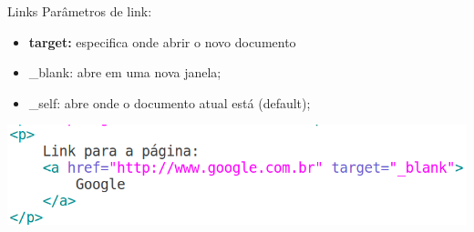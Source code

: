 \documentclass{beamer}
\begin{document}
\begin{frame}{Links}
  Parâmetros de link:
     \begin{itemize}
      \item \textbf{target:} especifica onde abrir o novo documento
       \item \_blank: abre em uma nova janela;
       \item \_self: abre onde o documento atual está (default); 
     \end{itemize}
     
     \includegraphics[height=0.25\paperheight]{fig/aula1/html7.png}
\end{frame}
\end{document}

